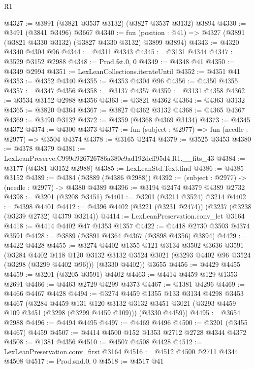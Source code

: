 \begin{lexlean}{R1}
\begin{coremodule}
@4327 := @3891 (@3821 @3537 @3132) (@3827 @3537 @3132) @3894
@4330 := @3491 (@3841 @3496) @3667
@4340 := fun (position : @41) => @4327 (@3891 (@3821 @4330 @3132) (@3827 @4330 @3132) @3899 @3894)
@4343 := @4320 @4340 @4304 @96
@4344 := @4311 @4343
@4345 := @3131 @4344
@4347 := @3529 @3152 @2988
@4348 := Prod.fst.{0, 0}
@4349 := @4348 @41
@4350 := @4349 @2994
@4351 := LexLeanCollections.iterateUntil
@4352 := @4351 @41
@4353 := @4352 @4340
@4355 := @4353 @4304 @96
@4356 := @4350 @4355
@4357 := @4347 @4356
@4358 := @3137 @4357
@4359 := @3131 @4358
@4362 := @3534 @3152 @2988 @4356
@4363 := @3821 @4362
@4364 := @4363 @3132
@4365 := @3820 @4364
@4367 := @3827 @4362 @3132
@4368 := @4365 @4367
@4369 := @3490 @3132
@4372 := @4359 (@4368 @4369 @3134)
@4373 := @4345 @4372
@4374 := @4300 @4373
@4377 := fun (subject : @2977) => fun (needle : @2977) => @3504 @4374
@4378 := @3165 @2474
@4379 := @3525 @3453
@4380 := @4378 @4379
@4381 := LexLeanPreserve.C999d926726786a380c9ad192dcff95d4.R1.__fits_43
@4384 := @3177 (@4381 @3152 @2988)
@4385 := LexLeanStd.Text.find
@4386 := @4385 @3152
@4389 := @4384 (@3889 (@4386 @2988))
@4392 := (subject : @2977) -> (needle : @2977) -> @4380 @4389
@4396 := @3194 @2474 @4379 @4389 @2732
@4398 := @3201 (@3208 @3451)
@4401 := @3201 (@3211 @3524) @3214
@4402 := @4398 @4401
@4412 := @4396 @4402 (@3221 (@3231 @2474)) (@3237 (@3238 (@3239 @2732) @4379 @3214))
@4414 := LexLeanPreservation.conv_let @3164
@4418 := @4414 @4402 @47 @1353 @1357
@4422 := @4418 @2730 @3503 @4374 @3591
@4428 := @3889 (@3891 @4364 @4367 (@3898 @4356) @3894)
@4429 := @4422 @4428
@4455 := @3274
    @4402
    @1355
    @121
    @3134
    @3502
    @3636
    @3591
    (@3284
      @4402
      @118
      @120
      @3132
      @3132
      @3524
      @3021
      (@3293 @4402 @96 @3524 (@3298 (@3299 @4402 @96)))
      (@3330 @4402))
    @3655
@4456 := @4429 @4455
@4459 := @3201 (@3205 @3591) @4402
@4463 := @4414 @4459 @129 @1353 @2691
@4466 := @4463 @2729 @4299 @4373
@4467 := @1381 @4296
@4469 := @4466 @4467 @4428
@4494 := @3274
    @4459
    @1355
    @133
    @3134
    @4298
    @3453
    @4467
    (@3284
      @4459
      @131
      @120
      @3132
      @3132
      @3451
      @3021
      (@3293 @4459 @109 @3451 (@3298 (@3299 @4459 @109)))
      (@3330 @4459))
@4495 := @3654 @2988
@4496 := @4494 @4495
@4497 := @4469 @4496
@4500 := @3201 (@3455 @4467) @4459
@4507 := @4414 @4500 @152 @1353 @2712 @2728 @4344 @4372
@4508 := @1381 @4356
@4510 := @4507 @4508 @4428
@4512 := LexLeanPreservation.conv_first @3164
@4516 := @4512 @4500 @2711 @4344 @4508
@4517 := Prod.snd.{0, 0}
@4518 := @4517 @41

\end{coremodule}
\end{lexlean}
